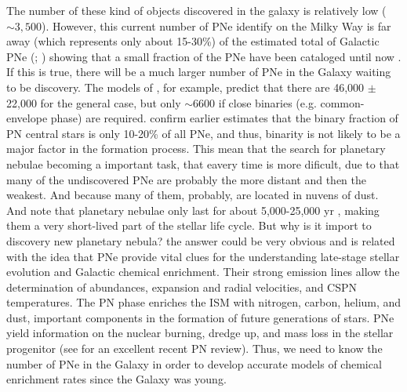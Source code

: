 \documentclass[fleqn,usenatbib]{mnras}
\begin{document}
The number of these kind of objects discovered in the galaxy is relatively low (\(\sim 3,500\)).
However, this current number of PNe identify on the Milky Way is far away (which represents
only about 15-30\%) of the estimated total of Galactic PNe (\citealp{Frew:2008}; \citealp{Jacoby:2010})
showing that a small fraction of the PNe have been cataloged until now \citep{Frew:2017}.
If this is true, there will be a much larger number of PNe in the Galaxy waiting to be discovery.
The models of \citet{Moe:2006}, for example, predict that there are 46,000 $\pm$ 22,000
for the general case, but only $\sim$6600 \citep{Marco:2005} if close binaries
(e.g. common-envelope phase) are required. \citet{Miszalski:2009} confirm earlier estimates
that the binary fraction of PN central stars is only 10-20\% of all
PNe, and thus, binarity is not likely to be a major factor in
the formation process. This mean that the search for planetary nebulae
becoming a important task, that eavery time is more dificult, due to that many of
the undiscovered PNe are probably the more distant and then the weakest.
And because many of them, probably, are located in nuvens of dust.
And note that planetary nebulae only last for about 5,000-25,000 yr \citep{Badenes:2015},
making them a very short-lived part of the stellar life cycle.
But why is it import to discovery new planetary nebula? the answer could be very obvious and is
related with the idea that PNe provide vital clues for the understanding late-stage stellar
evolution and Galactic chemical enrichment. Their strong emission lines allow the determination
of abundances, expansion and radial velocities, and
CSPN temperatures. The PN phase enriches the ISM with nitrogen, carbon, helium,
and dust, important components in the formation of future
generations of stars. PNe yield information on the nuclear
burning, dredge up, and mass loss in the stellar progenitor
(see \citealp{Kwitter:2022} for an excellent recent PN
review). Thus, we need to know the number of PNe in
the Galaxy in order to develop accurate models of 
chemical enrichment rates since the Galaxy was young.
\end{document}

